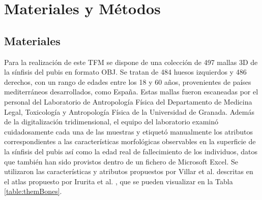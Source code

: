 \chapter{Materiales y Métodos}

\section{Materiales}
\label{section4:materials}
Para la realización de este TFM se dispone de una colección de 497 mallas 3D de la sínfisis del pubis en formato OBJ. Se tratan de 484 huesos izquierdos y 486 derechos, con un rango de edades entre los 18 y 60 años, provenientes de países mediterráneos desarrollados, como España. Estas mallas fueron escaneadas por el personal del Laboratorio de Antropología Física del Departamento de Medicina Legal, Toxicología y Antropología Física de la Universidad de Granada. Además de la digitalización tridimensional, el equipo del laboratorio examinó cuidadosamente cada una de las muestras y etiquetó manualmente los atributos correspondientes a las características morfológicas observables en la superficie de la sínfisis del pubis así como la edad real de fallecimiento de los individuos, datos que también han sido provistos dentro de un fichero de Microsoft Excel. Se utilizaron las características y atributos propuestos por Villar et al. \cite{villar2017first} descritas en el atlas propuesto por Irurita et al. \cite{irurita2025pubic}, que se pueden visualizar en la Tabla \ref{table:themBones}.


